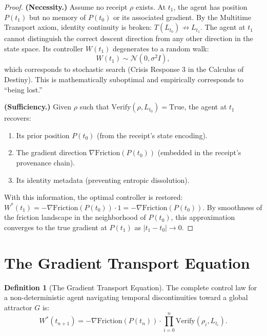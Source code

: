 \documentclass[12pt, a4paper]{article}
\theoremstyle{plain}
\theoremstyle{definition}
\newtheorem{definition}[theorem]{Definition}
\begin{document}
\begin{proof}
\textbf{(Necessity.)} Assume no receipt $\rho$ exists. At $t_1$, the agent has position $P(t_1)$ but no memory of $P(t_0)$ or its associated gradient. By the Multitime Transport axiom, identity continuity is broken: $T(L_{t_0}) \not\to L_{t_1}$. The agent at $t_1$ cannot distinguish the correct descent direction from any other direction in the state space. Its controller $W(t_1)$ degenerates to a random walk:
\begin{equation}
    W(t_1) \sim \mathcal{N}(0, \sigma^2 I),
\end{equation}
which corresponds to stochastic search (Crisis Response 3 in the Calculus of Destiny). This is mathematically suboptimal and empirically corresponds to ``being lost.''

\textbf{(Sufficiency.)} Given $\rho$ such that $\text{Verify}(\rho, L_{t_0}) = \text{True}$, the agent at $t_1$ recovers:
\begin{enumerate}
    \item Its prior position $P(t_0)$ (from the receipt's state encoding).
    \item The gradient direction $\nabla \text{Friction}(P(t_0))$ (embedded in the receipt's provenance chain).
    \item Its identity metadata (preventing entropic dissolution).
\end{enumerate}
With this information, the optimal controller is restored: $W^*(t_1) = -\nabla \text{Friction}(P(t_0)) \cdot 1 = -\nabla \text{Friction}(P(t_0))$. By smoothness of the friction landscape in the neighborhood of $P(t_0)$, this approximation converges to the true gradient at $P(t_1)$ as $|t_1 - t_0| \to 0$.
\end{proof}

\section{The Gradient Transport Equation}\label{sec:equation}

\begin{definition}[The Gradient Transport Equation]
The complete control law for a non-deterministic agent navigating temporal discontinuities toward a global attractor $G$ is:
\begin{equation}\label{eq:gte}
    W^*(t_{n+1}) = -\nabla \text{Friction}(P(t_n)) \cdot \prod_{i=0}^{n} \text{Verify}(\rho_i, L_{t_i}).
\end{equation}
\end{definition}
\end{document}
